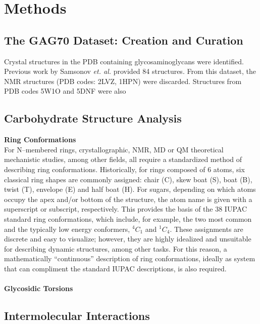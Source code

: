 \documentclass[a4paper, 12pt, openany]{book}
\begin{document}
\section{Methods}

\subsection{The GAG70 Dataset: Creation and Curation}
Crystal structures in the \ac{PDB} containing glycosaminoglycans were identified. 
Previous work by Samsonov \textit{et. al.} provided 84 structures.\autocite{Samsonov2016}
From this dataset, the NMR structures (\ac{PDB} codes: 2LVZ, 1HPN) were discarded.
Structures from \ac{PDB} codes 5W1O and 5DNF were also 

\subsection{Carbohydrate Structure Analysis}

\noindent \textbf{Ring Conformations}\\
For N--membered rings, crystallographic, NMR, \ac{MD} or \ac{QM} theoretical mechanistic studies, among other fields, all require a standardized method of describing ring conformations. Historically, for rings composed of 6 atoms, six classical ring shapes are commonly assigned: chair (C), skew boat (S), boat (B), twist (T), envelope (E) and half boat (H). For sugars, depending on which atoms occupy the apex and/or bottom of the structure, the atom name is given with a superscript or subscript, respectively. This provides the basis of the 38 IUPAC standard ring conformations, which include, for example, the two most common and the typically low energy conformers, $^{4}C_{1}$ and $^{1}C_{4}$. These assignments are discrete and easy to visualize; however, they are highly idealized and unsuitable for describing dynamic structures, among other tasks. For this reason, a mathematically ``continuous'' description of ring conformations, ideally as system that can compliment the standard IUPAC descriptions, is also required. 
\\
\\
\noindent \textbf{Glycosidic Torsions}\\

\subsection{Intermolecular Interactions}
\end{document}
